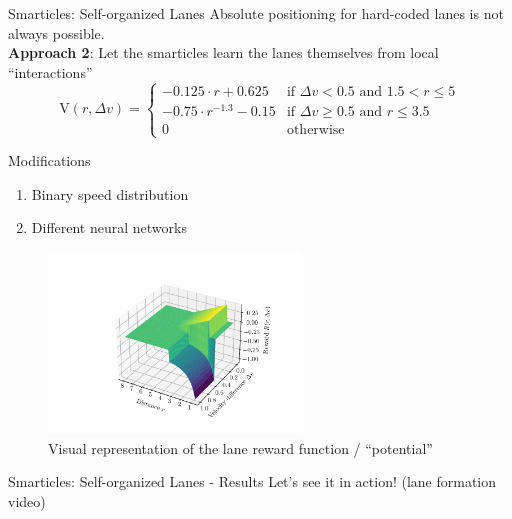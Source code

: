 \documentclass[10pt,xcolor=table, aspectratio=1610]{beamer}
\begin{document}
\begin{frame}{Smarticles: Self-organized Lanes}
  Absolute positioning for hard-coded lanes is not always possible.\\
  \textbf{Approach 2}: Let the smarticles learn the lanes themselves from local \enquote{interactions}\\
  \begin{equation*}
    \text{V}(r, \Delta v) = \begin{cases}
      -0.125 \cdot r + 0.625 & \text{if } \Delta v < 0.5 \text{ and } 1.5 < r \le 5 \\
      -0.75 \cdot r^{-1.3} - 0.15 & \text{if } \Delta v \ge 0.5 \text{ and } r \le 3.5 \\
      0 & \text{otherwise}
  \end{cases}
  \end{equation*}
  \begin{block}{Modifications}
    \begin{enumerate}
      \item Binary speed distribution
      \item Different neural networks
    \end{enumerate}
  \end{block}
\end{frame}

\begin{frame}
  \begin{figure}
    \includegraphics[width=0.6\textwidth]{../Thesis/img/results/lane_reward_func_3d_cropped.pdf}
    \caption*{\hspace{0.2\textwidth}Visual representation of the lane reward function / \enquote{potential}}
  \end{figure}
\end{frame}

\begin{frame}{Smarticles: Self-organized Lanes - Results}
  Let's see it in action! (lane formation video)
\end{frame}
\end{document}
